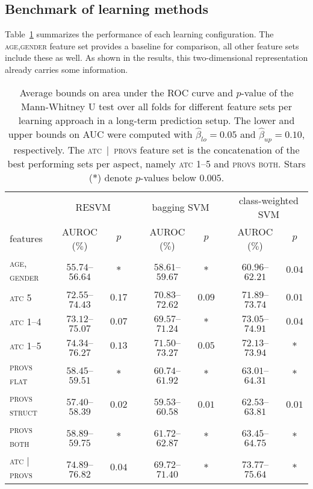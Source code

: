 \documentclass[twoside,11pt]{article}
\begin{document}
\subsection{Benchmark of learning methods} \label{benchmark}
Table~\ref{table:results} summarizes the performance of each learning configuration. The \textsc{age,gender} feature set provides a baseline for comparison, all other feature sets include these as well. As shown in the results, this two-dimensional representation already carries some information.

\begin{table}[!h]
\centering
\begin{tabular}{lcccccccc}
\toprule
 		 & \multicolumn{2}{c}{RESVM} 	 & & \multicolumn{2}{c}{bagging SVM} 	& & \multicolumn{2}{c}{class-weighted SVM} \\ \cline{2-3} \cline{5-6} \cline{8-9}
features	 & AUROC ($\%$)	 & $p$ 		 & & AUROC ($\%$) & $p$			& & AUROC ($\%$) & $p$ \\
\midrule
\textsc{age, gender}	 & $55.74$--$56.64$ & $*$ & & $58.61$--$59.67$ & $*$ & & $\mathbf{60.96}$--$\mathbf{62.21}$ & $0.04$ \\
\textsc{atc 5}		 & $\mathbf{72.55}$--$\mathbf{74.43}$ 	& $0.17$ & & $70.83$--$72.62$ & $0.09$ & & $71.89$--$73.74$ 			& $0.01$ \\
\textsc{atc 1--4}	 & $\mathbf{73.12}$--$\mathbf{75.07}$ & $0.07$ & & $69.57$--$71.24$ & $*$ & & $73.05$--$74.91$ & $0.04$ \\
\textsc{atc 1--5} 	 & $\mathbf{74.34}$--$\mathbf{76.27}$ 	& $0.13$ & & $71.50$--$73.27$ & $0.05$ & & $72.13$--$73.94$ 			& $*$ \\
\textsc{provs flat}	 & $58.45$--$59.51$ & $*$ & & $60.74$--$61.92$ & $*$ & & $\mathbf{63.01}$--$\mathbf{64.31}$ & $*$ \\
\textsc{provs struct}	 & $57.40$--$58.39$ & $0.02$ & & $59.53$--$60.58$ & $0.01$ & & $\mathbf{62.53}$--$\mathbf{63.81}$ & $0.01$ \\
\textsc{provs both}	 & $58.89$--$59.75$ & $*$ & & $61.72$--$62.87$ & $*$ & & $\mathbf{63.45}$--$\mathbf{64.75}$ & $*$ \\
\textsc{atc $|$ provs}	 & $\mathbf{74.89}$--$\mathbf{76.82}$ & $0.04$ & & $69.72$--$71.40$ & $*$ & & $73.77$--$75.64$ & $*$ \\

\bottomrule
\end{tabular}
\caption{Average bounds on area under the ROC curve and $p$-value of the Mann-Whitney U test over all folds for different feature sets per learning approach in a long-term prediction setup. The lower and upper bounds on AUC were computed with $\hat{\beta}_{lo}=0.05$ and $\hat{\beta}_{up}=0.10$, respectively. The \mbox{\textsc{atc $|$ provs}} feature set is the concatenation of the best performing sets per aspect, namely \textsc{atc 1--5} and \textsc{provs both}. Stars ($*$) denote $p$-values below $0.005$.
}
\label{table:results}
\end{table}
\end{document}
